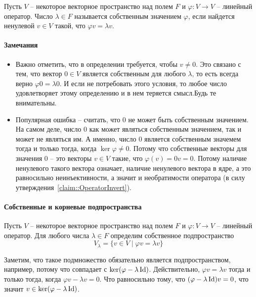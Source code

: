 \begin{definition}
Пусть $V$ -- некоторое векторное пространство над полем $F$ и $\varphi \colon V\to V$ -- линейный оператор. Число $\lambda \in F$ называется собственным значением $\varphi$, если найдется ненулевой $v\in V$ такой, что $\varphi v = \lambda v$.
\end{definition}

\paragraph{Замечания}
\begin{itemize}
\item Важно отметить, что в определении требуется, чтобы $v\neq 0$. Это связано с тем, что вектор $0\in V$ является собственным для любого $\lambda$, то есть всегда верно $\varphi 0 = \lambda 0$. И если не потребовать этого условия, то любое число удовлетворяет этому определению и в нем теряется смысл.Будь те внимательны.

\item Популярная ошибка -- считать, что $0$ не может быть собственным значением. На самом деле, число $0$ как может являться собственным значением, так и может не являться им. А именно, число $0$ является собственным значемем тогда и только тогда, когда $\ker \varphi \neq 0$. Потому что собственные векторы для значения $0$ -- это векторы $v\in V$ такие, что $\varphi(v) = 0 v = 0$. Потому наличие ненулевого такого вектора означает, наличие ненулевого вектора в ядре, а это равносильно неинъективности, а значит и необратимости оператора (в силу утверждения~\ref{claim::OperatorInvert}).
\end{itemize}

\paragraph{Собственные и корневые подпространства}

\begin{definition}
Пусть $V$ -- некоторое векторное пространство над полем $F$ и $\varphi \colon V\to V$ -- линейный оператор. Для любого числа $\lambda \in F$ определим собственное подпространство
\[
V_\lambda = \{v\in V\mid \varphi v = \lambda v\}
\]
\end{definition}

Заметим, что такое подмножество обязательно является подпространством, например, потому что совпадает с $\ker (\varphi - \lambda \operatorname{Id})$. Действительно, $\varphi v = \lambda v$ тогда и только тогда, когда $\varphi v - \lambda v = 0$. Что равносильно тому, что $(\varphi - \lambda \operatorname{Id})v = 0$, что значит $v\in \ker(\varphi - \lambda \operatorname{Id})$.

